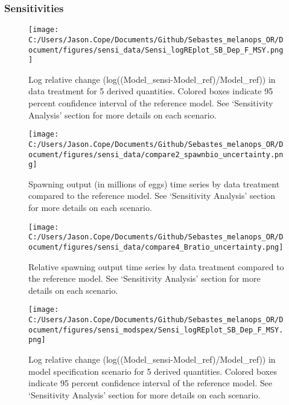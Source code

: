 \documentclass[11pt,
  english,
  letterpaper,
]{article}
\begin{document}
\newpage

\hypertarget{sensitivities}{%
\subsubsection{Sensitivities}\label{sensitivities}}

\begin{figure}
\centering
\texttt{[image: C:/Users/Jason.Cope/Documents/Github/Sebastes\_melanops\_OR/Document/figures/sensi\_data/Sensi\_logREplot\_SB\_Dep\_F\_MSY.png]}
\caption{Log relative change (log((Model\_sensi-Model\_ref)/Model\_ref)) in data treatment for 5 derived quantities. Colored boxes indicate 95 percent confidence interval of the reference model. See `Sensitivity Analysis' section for more details on each scenario.\label{fig:sensi-data-RE}}
\end{figure}

\newpage

\begin{figure}
\centering
\texttt{[image: C:/Users/Jason.Cope/Documents/Github/Sebastes\_melanops\_OR/Document/figures/sensi\_data/compare2\_spawnbio\_uncertainty.png]}
\caption{Spawning output (in millions of eggs) time series by data treatment compared to the reference model. See `Sensitivity Analysis' section for more details on each scenario.\label{fig:sensi-data-ssb}}
\end{figure}

\newpage

\begin{figure}
\centering
\texttt{[image: C:/Users/Jason.Cope/Documents/Github/Sebastes\_melanops\_OR/Document/figures/sensi\_data/compare4\_Bratio\_uncertainty.png]}
\caption{Relative spawning output time series by data treatment compared to the reference model. See `Sensitivity Analysis' section for more details on each scenario.\label{fig:sensi-data-depl}}
\end{figure}

\newpage

\begin{figure}
\centering
\texttt{[image: C:/Users/Jason.Cope/Documents/Github/Sebastes\_melanops\_OR/Document/figures/sensi\_modspex/Sensi\_logREplot\_SB\_Dep\_F\_MSY.png]}
\caption{Log relative change (log((Model\_sensi-Model\_ref)/Model\_ref)) in model specification scenario for 5 derived quantities. Colored boxes indicate 95 percent confidence interval of the reference model. See `Sensitivity Analysis' section for more details on each scenario.\label{fig:sensi-modspec-RE}}
\end{figure}
\end{document}
